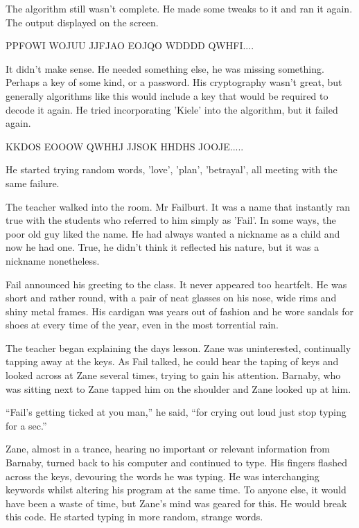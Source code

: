 The algorithm still wasn't complete.  He made some tweaks to it and ran it again.  The output displayed on the screen.



PPFOWI WOJUU JJFJAO EOJQO WDDDD QWHFI....



It didn't make sense.  He needed something else, he was missing something.  Perhaps a key of some kind, or a password.  His cryptography wasn't great, but generally algorithms like this would include a key that would be required to decode it again.  He tried incorporating 'Kiele' into the algorithm, but it failed again.



KKDOS EOOOW QWHHJ JJSOK HHDHS JOOJE.....



He started trying random words, 'love', 'plan', 'betrayal', all meeting with the same failure.  

The teacher walked into the room.  Mr Failburt.  It was a name that instantly ran true with the students who referred to him simply as 'Fail'.  In some ways, the poor old guy liked the name.  He had always wanted a nickname as a child and now he had one.  True, he didn't think it reflected his nature, but it was a nickname nonetheless.

Fail announced his greeting to the class.  It never appeared too heartfelt.  He was short and rather round, with a pair of neat glasses on his nose, wide rims and shiny metal frames.  His cardigan was years out of fashion and he wore sandals for shoes at every time of the year, even in the most torrential rain.

The teacher began explaining the days lesson.  Zane was uninterested, continually tapping away at the keys.  As Fail talked, he could hear the taping of keys and looked across at Zane several times, trying to gain his attention.  Barnaby, who was sitting next to Zane tapped him on the shoulder and Zane looked up at him.

``Fail's getting ticked at you man,'' he said, ``for crying out loud just stop typing for a sec.''

Zane, almost in a trance, hearing no important or relevant information from Barnaby, turned back to his computer and continued to type.  His fingers flashed across the keys, devouring the words he was typing.  He was interchanging keywords whilst altering his program at the same time.  To anyone else, it would have been a waste of time, but Zane's mind was geared for this.  He would break this code.  He started typing in more random, strange words.  

